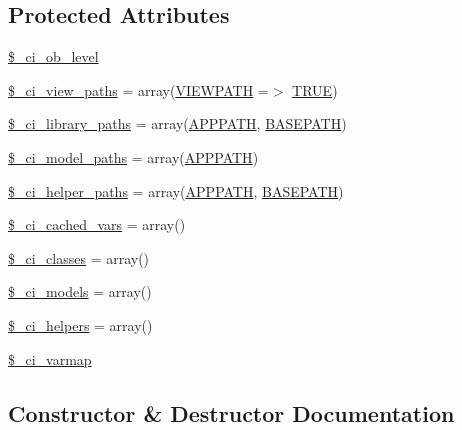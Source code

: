 \subsection*{Protected Attributes}
\begin{DoxyCompactItemize}
\item 
\mbox{\hyperlink{class_c_i___loader_a499cf11349613b24142f9c13aa83ee1b}{\$\+\_\+ci\+\_\+ob\+\_\+level}}
\item 
\mbox{\hyperlink{class_c_i___loader_adc48c64c673b28c2447ea4214a27eeea}{\$\+\_\+ci\+\_\+view\+\_\+paths}} = array(\mbox{\hyperlink{index_8php_ade8921d52af58583e5727833459224c3}{V\+I\+E\+W\+P\+A\+TH}} =$>$ \mbox{\hyperlink{constants_8php_ae04a3efe6aa42044f803ee90c2277846}{T\+R\+UE}})
\item 
\mbox{\hyperlink{class_c_i___loader_a2cafeab35438db8fc21754e311b14e09}{\$\+\_\+ci\+\_\+library\+\_\+paths}} = array(\mbox{\hyperlink{index_8php_a644e58bbe10b41e25c0768345587f4aa}{A\+P\+P\+P\+A\+TH}}, \mbox{\hyperlink{index_8php_ad39801cabfd338dc5524466fe793fda9}{B\+A\+S\+E\+P\+A\+TH}})
\item 
\mbox{\hyperlink{class_c_i___loader_ac5f53015a6bd6ce67af5e30cb156cce4}{\$\+\_\+ci\+\_\+model\+\_\+paths}} = array(\mbox{\hyperlink{index_8php_a644e58bbe10b41e25c0768345587f4aa}{A\+P\+P\+P\+A\+TH}})
\item 
\mbox{\hyperlink{class_c_i___loader_a6ed0348d5a8afc689d71a234de8da95c}{\$\+\_\+ci\+\_\+helper\+\_\+paths}} = array(\mbox{\hyperlink{index_8php_a644e58bbe10b41e25c0768345587f4aa}{A\+P\+P\+P\+A\+TH}}, \mbox{\hyperlink{index_8php_ad39801cabfd338dc5524466fe793fda9}{B\+A\+S\+E\+P\+A\+TH}})
\item 
\mbox{\hyperlink{class_c_i___loader_a963cdc111da481606d2d67adf4c2947f}{\$\+\_\+ci\+\_\+cached\+\_\+vars}} = array()
\item 
\mbox{\hyperlink{class_c_i___loader_adad50876041bed7c7bf44aac03eb1162}{\$\+\_\+ci\+\_\+classes}} = array()
\item 
\mbox{\hyperlink{class_c_i___loader_adf3c08ef6905b17b2237bfa89d556f2c}{\$\+\_\+ci\+\_\+models}} = array()
\item 
\mbox{\hyperlink{class_c_i___loader_abc8797a91f1cdb473e2d0ad65dcbff55}{\$\+\_\+ci\+\_\+helpers}} = array()
\item 
\mbox{\hyperlink{class_c_i___loader_a8dd33a8ab99688451b1f811f122d1114}{\$\+\_\+ci\+\_\+varmap}}
\end{DoxyCompactItemize}


\subsection{Constructor \& Destructor Documentation}
\mbox{\label{class_c_i___loader_a095c5d389db211932136b53f25f39685}} 
